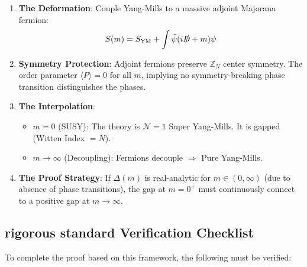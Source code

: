\begin{enumerate}
\item \textbf{The Deformation}: Couple Yang-Mills to a massive adjoint Majorana fermion:
\[
S(m) = S_{\text{YM}} + \int \bar{\psi}(i\slashed{D} + m)\psi
\]
\begin{center}
\end{center}

\item \textbf{Symmetry Protection}: Adjoint fermions preserve $\mathbb{Z}_N$ center 
symmetry. The order parameter $\langle P \rangle = 0$ for all $m$, implying no 
symmetry-breaking phase transition distinguishes the phases.
\begin{center}
\end{center}

\item \textbf{The Interpolation}:
\begin{itemize}
\item $m = 0$ (SUSY): The theory is $\mathcal{N}=1$ Super Yang-Mills. It is gapped 
(Witten Index $= N$).
\item $m \to \infty$ (Decoupling): Fermions decouple $\Rightarrow$ Pure Yang-Mills.
\end{itemize}
\begin{center}
\end{center}

\item \textbf{The Proof Strategy}: If $\Delta(m)$ is real-analytic for $m \in (0, \infty)$ 
(due to absence of phase transitions), the gap at $m = 0^+$ must continuously 
connect to a positive gap at $m \to \infty$.
\begin{center}
\end{center}
\end{enumerate}

\subsection{rigorous standard Verification Checklist}

To complete the proof based on this framework, the following must be verified:

